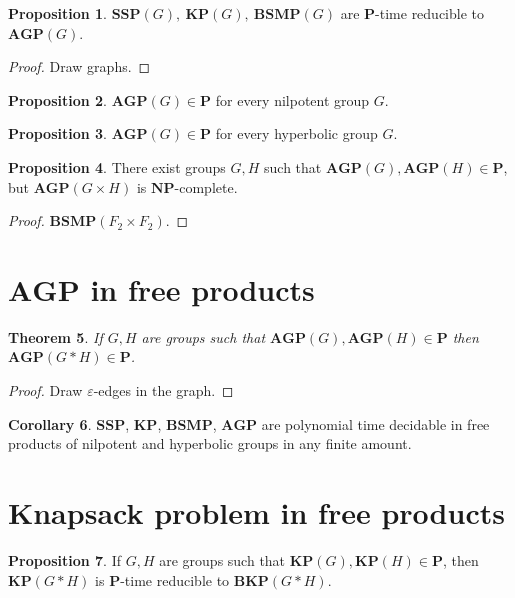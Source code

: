 \documentclass[11pt]{amsart}
\newtheorem{theorem}{Theorem}[section]
\theoremstyle{definition}
\newtheorem{proposition}[theorem]{Proposition}
\newtheorem{corollary}[theorem]{Corollary}
\def\P{{\mathbf{P}}}
\def\NP{{\mathbf{NP}}}
\def\SSP{{\mathbf{SSP}}}
\def\BSMP{{\mathbf{BSMP}}}
\def\BKP{{\mathbf{BKP}}}
\def\KP{{\mathbf{KP}}}
\def\AGP{{\mathbf{AGP}}}
\begin{document}
\begin{proposition}
$\SSP(G),\ \KP(G),\ \BSMP(G)$ are $\P$-time reducible to $\AGP(G)$.
\end{proposition}
\begin{proof} Draw graphs.
\end{proof}

\begin{proposition}
$\AGP(G)\in\P$ for every nilpotent group $G$.
\end{proposition}

\begin{proposition}
$\AGP(G)\in\P$ for every hyperbolic group $G$.
\end{proposition}


\begin{proposition}
There exist groups $G,H$ such that $\AGP(G),\AGP(H)\in\P$, but $\AGP(G\times H)$ is $\NP$-complete.
\end{proposition}
\begin{proof}
$\BSMP(F_2\times F_2)$.
\end{proof}

\section{$\AGP$ in free products}\label{sec:free_prod}
\begin{theorem}
If $G,H$ are groups such that $\AGP(G),\AGP(H)\in\P$ then $\AGP(G*H)\in\P$.
\end{theorem}
\begin{proof}
Draw $\varepsilon$-edges in the graph.
\end{proof}
\begin{corollary}
$\SSP$, $\KP$, $\BSMP$, $\AGP$ are polynomial time decidable in free products of nilpotent and hyperbolic groups in any finite amount.
\end{corollary}

\section{Knapsack problem in free products}\label{sec:knapsack}

\begin{proposition}
If $G,H$ are groups such that $\KP(G),\KP(H)\in\P$, then $\KP(G*H)$ is $\P$-time reducible to $\BKP(G*H)$.
\end{proposition}


%

\end{document}
